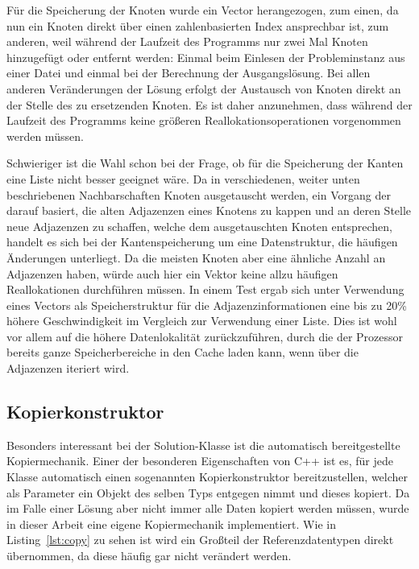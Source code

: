 Für die Speicherung der Knoten wurde ein Vector herangezogen, zum einen, da nun ein Knoten direkt über einen zahlenbasierten Index ansprechbar ist, zum anderen, weil während der Laufzeit des Programms nur
zwei Mal Knoten hinzugefügt oder entfernt werden: Einmal beim Einlesen der Probleminstanz aus einer Datei und einmal bei der Berechnung der Ausgangslösung. Bei allen anderen Veränderungen der Lösung erfolgt
der Austausch von Knoten direkt an der Stelle des zu ersetzenden Knoten. Es ist daher anzunehmen, dass während der Laufzeit des Programms keine größeren Reallokationsoperationen vorgenommen werden müssen.

Schwieriger ist die Wahl schon bei der Frage, ob für die Speicherung der Kanten eine Liste nicht besser geeignet wäre. Da in verschiedenen, weiter unten beschriebenen Nachbarschaften Knoten ausgetauscht werden,
ein Vorgang der darauf basiert, die alten Adjazenzen eines Kno\-tens zu kappen und an deren Stelle neue Adjazenzen zu schaffen, welche dem ausgetauschten Knoten entsprechen, handelt es sich bei der Kantenspeicherung
um eine Datenstruktur, die häufigen Änderungen unterliegt. Da die meisten Knoten aber eine ähnliche Anzahl an Adjazenzen haben, würde auch hier ein Vektor keine allzu häufigen Reallokationen durchführen müssen.
In einem Test ergab sich unter Verwendung eines Vectors als Speicherstruktur für die Adjazenzinformationen eine bis zu 20\% höhere Geschwindigkeit im Vergleich zur Verwendung einer Liste. Dies ist wohl vor allem
auf die höhere Datenlokalität zurückzuführen, durch die der Prozessor bereits ganze Speicherbereiche in den Cache laden kann, wenn über die Adjazenzen iteriert wird.

\subsection{Kopierkonstruktor}
\label{sec:copy}

Besonders interessant bei der Solution-Klasse ist die automatisch bereitgestellte Ko\-pier\-mech\-a\-nik. Einer der besonderen Eigenschaften von C++ ist es, für jede Klasse automatisch einen sogenannten Kopierkonstruktor
bereitzustellen, welcher als Parameter ein Objekt des selben Typs entgegen nimmt und dieses kopiert. Da im Falle einer Lösung aber nicht immer alle Daten kopiert werden müssen, wurde in dieser Arbeit eine
eigene Kopiermechanik implementiert. Wie in Listing~\ref{lst:copy} zu sehen ist wird ein Großteil der Referenzdatentypen direkt übernommen, da diese häufig gar nicht verändert werden. 

